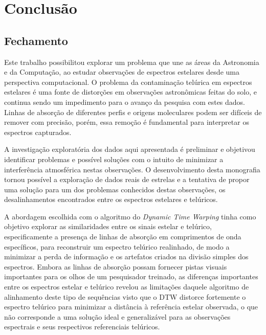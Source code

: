 \chapter{Conclusão}
\label{cap:conclusoes}

\section{Fechamento}

Este trabalho possibilitou explorar um problema que une as áreas da Astronomia e da Computação, ao estudar observações de espectros estelares desde uma perspectiva computacional. O problema da contaminação telúrica em espectros estelares é uma fonte de distorções em observações astronômicas feitas do solo, e continua sendo um impedimento para o avanço da pesquisa com estes dados. Linhas de absorção de diferentes perfis e origens moleculares podem ser difíceis de remover com precisão, porém, essa remoção é fundamental para interpretar os espectros capturados. 

A investigação exploratória dos dados aqui apresentada é preliminar e objetivou identificar problemas e possível soluções com o intuito de minimizar a interferência atmosférica nestas observações. O desenvolvimento desta monografia tornou possível a exploração de dados reais de estrelas e a tentativa de propor uma solução para um dos problemas conhecidos destas observações, os desalinhamentos encontrados entre os espectros estelares e telúricos.

A abordagem escolhida com o algoritmo do \textit{Dynamic Time Warping} tinha como objetivo explorar as similaridades entre os sinais estelar e telúrico, especificamente a presença de linhas de absorção em comprimentos de onda específicos, para reconstruir um espectro telúrico realinhado, de modo a minimizar a perda de informação e os artefatos criados na divisão simples dos espectros. Embora as linhas de absorção possam fornecer pistas visuais importantes para os olhos de um pesquisador treinado, as diferenças importantes entre os espectros estelar e telúrico revelou as limitações daquele algoritmo de alinhamento deste tipo de sequências visto que o DTW distorce fortemente o espectro telúrico para minimizar a distância à referência estelar observada, o que não corresponde a uma solução ideal e generalizável para as observações espectrais e seus respectivos referenciais telúricos.

